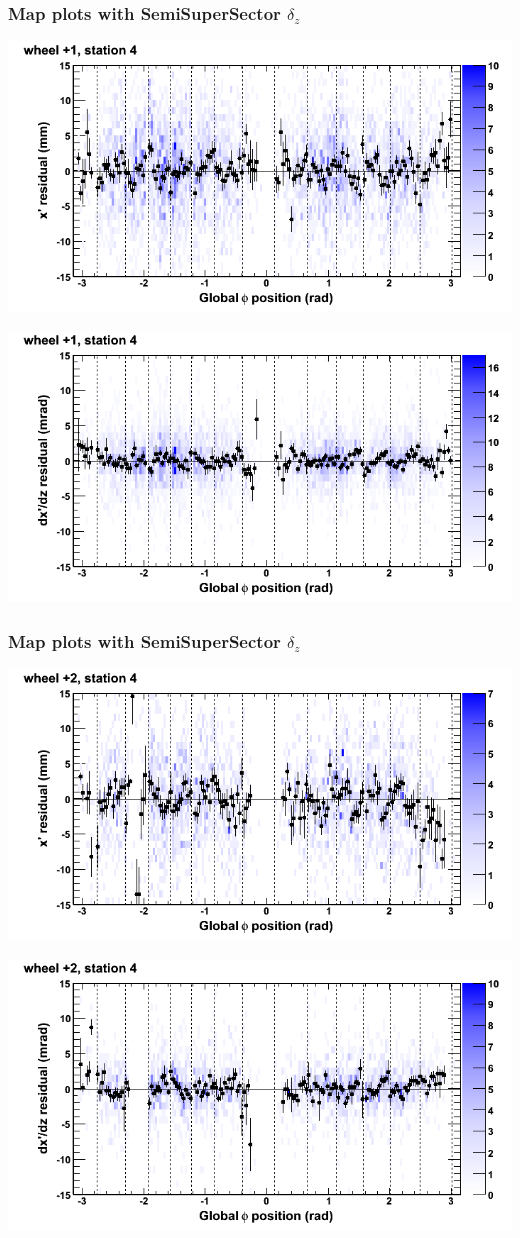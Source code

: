\documentclass[compress]{beamer}
\begin{document}
\begin{frame}
\frametitle{Map plots with SemiSuperSector $\delta_z$}
\includegraphics[width=0.5\linewidth]{zfit_mapplots/DTvsphi_st4whD_x.png}

\includegraphics[width=0.5\linewidth]{zfit_mapplots/DTvsphi_st4whD_dxdz.png}
\end{frame}

\begin{frame}
\frametitle{Map plots with SemiSuperSector $\delta_z$}
\includegraphics[width=0.5\linewidth]{zfit_mapplots/DTvsphi_st4whE_x.png}

\includegraphics[width=0.5\linewidth]{zfit_mapplots/DTvsphi_st4whE_dxdz.png}
\end{frame}
\end{document}
